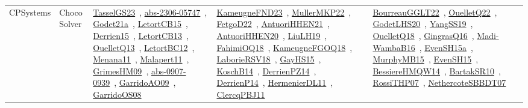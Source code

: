 {\begin{longtable}{lp{3cm}>{\raggedright\arraybackslash}p{6cm}>{\raggedright\arraybackslash}p{6cm}>{\raggedright\arraybackslash}p{8cm}}
CPSystems & Choco Solver & \href{works/TasselGS23.pdf}{TasselGS23}~\cite{TasselGS23}, \href{works/abs-2306-05747.pdf}{abs-2306-05747}~\cite{abs-2306-05747}, \href{works/Godet21a.pdf}{Godet21a}~\cite{Godet21a}, \href{works/LetortCB15.pdf}{LetortCB15}~\cite{LetortCB15}, \href{works/Derrien15.pdf}{Derrien15}~\cite{Derrien15}, \href{works/LetortCB13.pdf}{LetortCB13}~\cite{LetortCB13}, \href{works/OuelletQ13.pdf}{OuelletQ13}~\cite{OuelletQ13}, \href{works/LetortBC12.pdf}{LetortBC12}~\cite{LetortBC12}, \href{works/Menana11.pdf}{Menana11}~\cite{Menana11}, \href{works/Malapert11.pdf}{Malapert11}~\cite{Malapert11}, \href{works/GrimesHM09.pdf}{GrimesHM09}~\cite{GrimesHM09}, \href{works/abs-0907-0939.pdf}{abs-0907-0939}~\cite{abs-0907-0939}, \href{works/GarridoAO09.pdf}{GarridoAO09}~\cite{GarridoAO09}, \href{works/GarridoOS08.pdf}{GarridoOS08}~\cite{GarridoOS08} & \href{works/KameugneFND23.pdf}{KameugneFND23}~\cite{KameugneFND23}, \href{works/MullerMKP22.pdf}{MullerMKP22}~\cite{MullerMKP22}, \href{works/FetgoD22.pdf}{FetgoD22}~\cite{FetgoD22}, \href{works/AntuoriHHEN21.pdf}{AntuoriHHEN21}~\cite{AntuoriHHEN21}, \href{works/AntuoriHHEN20.pdf}{AntuoriHHEN20}~\cite{AntuoriHHEN20}, \href{works/LiuLH19.pdf}{LiuLH19}~\cite{LiuLH19}, \href{works/FahimiOQ18.pdf}{FahimiOQ18}~\cite{FahimiOQ18}, \href{works/KameugneFGOQ18.pdf}{KameugneFGOQ18}~\cite{KameugneFGOQ18}, \href{works/LaborieRSV18.pdf}{LaborieRSV18}~\cite{LaborieRSV18}, \href{works/GayHS15.pdf}{GayHS15}~\cite{GayHS15}, \href{works/KoschB14.pdf}{KoschB14}~\cite{KoschB14}, \href{works/DerrienPZ14.pdf}{DerrienPZ14}~\cite{DerrienPZ14}, \href{works/DerrienP14.pdf}{DerrienP14}~\cite{DerrienP14}, \href{works/HermenierDL11.pdf}{HermenierDL11}~\cite{HermenierDL11}, \href{works/ClercqPBJ11.pdf}{ClercqPBJ11}~\cite{ClercqPBJ11} & \href{works/BourreauGGLT22.pdf}{BourreauGGLT22}~\cite{BourreauGGLT22}, \href{works/OuelletQ22.pdf}{OuelletQ22}~\cite{OuelletQ22}, \href{works/GodetLHS20.pdf}{GodetLHS20}~\cite{GodetLHS20}, \href{works/YangSS19.pdf}{YangSS19}~\cite{YangSS19}, \href{works/OuelletQ18.pdf}{OuelletQ18}~\cite{OuelletQ18}, \href{works/GingrasQ16.pdf}{GingrasQ16}~\cite{GingrasQ16}, \href{works/Madi-WambaB16.pdf}{Madi-WambaB16}~\cite{Madi-WambaB16}, \href{works/EvenSH15a.pdf}{EvenSH15a}~\cite{EvenSH15a}, \href{works/MurphyMB15.pdf}{MurphyMB15}~\cite{MurphyMB15}, \href{works/EvenSH15.pdf}{EvenSH15}~\cite{EvenSH15}, \href{works/BessiereHMQW14.pdf}{BessiereHMQW14}~\cite{BessiereHMQW14}, \href{works/BartakSR10.pdf}{BartakSR10}~\cite{BartakSR10}, \href{works/RossiTHP07.pdf}{RossiTHP07}~\cite{RossiTHP07}, \href{works/NethercoteSBBDT07.pdf}{NethercoteSBBDT07}~\cite{NethercoteSBBDT07}\\

\end{longtable}}
